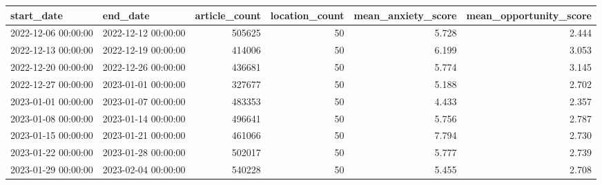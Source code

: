 \begin{tabular}{llrrrr}
\toprule
start\_date & end\_date & article\_count & location\_count & mean\_anxiety\_score & mean\_opportunity\_score \\
\midrule
2022-12-06 00:00:00 & 2022-12-12 00:00:00 & 505625 & 50 & 5.728 & 2.444 \\
2022-12-13 00:00:00 & 2022-12-19 00:00:00 & 414006 & 50 & 6.199 & 3.053 \\
2022-12-20 00:00:00 & 2022-12-26 00:00:00 & 436681 & 50 & 5.774 & 3.145 \\
2022-12-27 00:00:00 & 2023-01-01 00:00:00 & 327677 & 50 & 5.188 & 2.702 \\
2023-01-01 00:00:00 & 2023-01-07 00:00:00 & 483353 & 50 & 4.433 & 2.357 \\
2023-01-08 00:00:00 & 2023-01-14 00:00:00 & 496641 & 50 & 5.756 & 2.787 \\
2023-01-15 00:00:00 & 2023-01-21 00:00:00 & 461066 & 50 & 7.794 & 2.730 \\
2023-01-22 00:00:00 & 2023-01-28 00:00:00 & 502017 & 50 & 5.777 & 2.739 \\
2023-01-29 00:00:00 & 2023-02-04 00:00:00 & 540228 & 50 & 5.455 & 2.708 \\
\bottomrule
\end{tabular}
